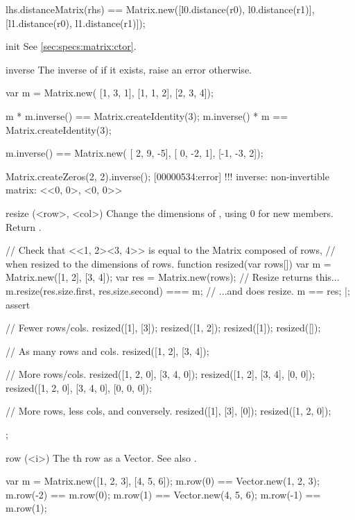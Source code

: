 \begin{urbiscriptapi}
\begin{urbiassert}
lhs.distanceMatrix(rhs)
  == Matrix.new([l0.distance(r0), l0.distance(r1)],
                [l1.distance(r0), l1.distance(r1)]);
\end{urbiassert}


\item[init]%
  See \autoref{sec:specs:matrix:ctor}.


\item[inverse]%
  The inverse of \this if it exists, raise an error otherwise.
\begin{urbiassert}
var m = Matrix.new(
  [1, 3, 1],
  [1, 1, 2],
  [2, 3, 4]);

m * m.inverse() == Matrix.createIdentity(3);
m.inverse() * m == Matrix.createIdentity(3);

m.inverse() == Matrix.new(
  [ 2,  9, -5],
  [ 0, -2,  1],
  [-1, -3,  2]);

Matrix.createZeros(2, 2).inverse();
[00000534:error] !!! inverse: non-invertible matrix: <<0, 0>, <0, 0>>
\end{urbiassert}


\item[resize](<row>, <col>)%
  Change the dimensions of \this, using 0 for new members.  Return \this.
\begin{urbiscript}
// Check that <<1, 2><3, 4>> is equal to the Matrix composed of rows,
// when resized to the dimensions of rows.
function resized(var rows[])
{
  var m = Matrix.new([1, 2], [3, 4]);
  var res = Matrix.new(rows);
  // Resize returns this...
  m.resize(res.size.first, res.size.second) === m;
  // ...and does resize.
  m == res;
}|;
assert
{
  // Fewer rows/cols.
  resized([1], [3]);
  resized([1, 2]);
  resized([1]);
  resized([]);

  // As many rows and cols.
  resized([1, 2], [3, 4]);

  // More rows/cols.
  resized([1, 2, 0], [3, 4, 0]);
  resized([1, 2], [3, 4], [0, 0]);
  resized([1, 2, 0], [3, 4, 0], [0, 0, 0]);

  // More rows, less cols, and conversely.
  resized([1], [3], [0]);
  resized([1, 2, 0]);
};
\end{urbiscript}


\item[row](<i>)%
  The th row as a Vector.  See also .
\begin{urbiassert}
var m = Matrix.new([1, 2, 3], [4, 5, 6]);
m.row(0) == Vector.new(1, 2, 3);  m.row(-2) == m.row(0);
m.row(1) == Vector.new(4, 5, 6);  m.row(-1) == m.row(1);


\end{urbiassert}
\end{urbiscriptapi}
